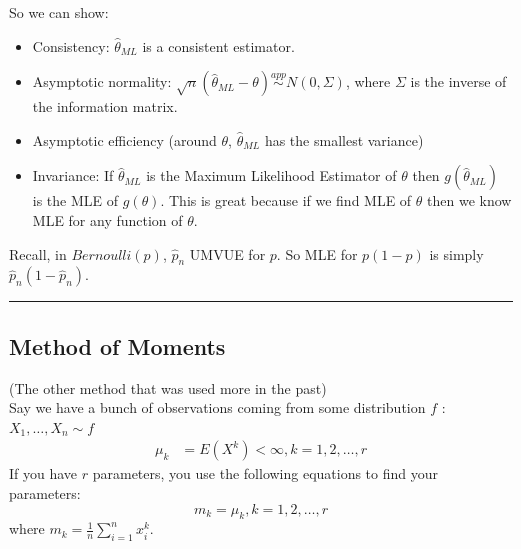 \documentclass[12 pt]{article}
\begin{document}
So we can show:
\begin{itemize}
\item Consistency: $\hat{\theta}_{ML}$ is a consistent estimator.
\item Asymptotic normality: $\sqrt{n}(\hat{\theta}_{ML} - \theta)
  \stackrel{app}{\sim}N(0,\Sigma)$, where $\Sigma$ is the inverse of
  the information matrix.
\item Asymptotic efficiency (around $\theta$, $\hat{\theta}_{ML}$ has
  the smallest variance)
\item Invariance: If $\hat{\theta}_{ML}$ is the Maximum Likelihood
  Estimator of $\theta$ then $g(\hat{\theta}_{ML})$ is the MLE of
  $g(\theta)$. This is great because if we find MLE of $\theta$ then
  we know MLE for any function of $\theta$.
\end{itemize}
Recall, in $Bernoulli(p)$, $\hat{p}_n$ UMVUE for $p$. So MLE for
$p(1-p)$ is simply $\hat{p}_n(1-\hat{p}_n)$.
\\ \noindent \rule{\textwidth}{0.5pt}
\subsection{Method of Moments} (The other method that was used more in
the past)
\\ Say we have a bunch of observations coming from some distribution $f$
: $X_1, \ldots, X_n\sim f$
\begin{align*}
  \mu_k & = E(X^k) < \infty, k=1,2,\ldots,r
\end{align*}
If you have $r$ parameters, you use the following equations to find
your parameters:
$$m_k = \mu_k, k = 1,2,\ldots,r$$ where $m_k = \frac{1}{n}\sum_{i=1}^n
x_i^k$.
\end{document}
